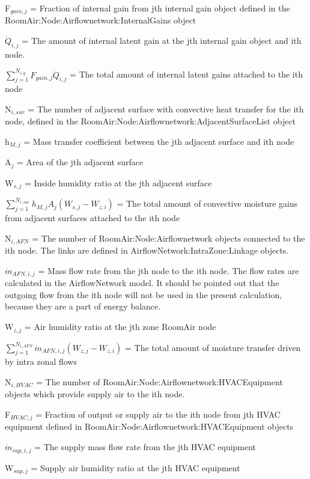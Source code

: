 {F\(_{gain,j}\) = Fraction of internal gain from jth internal gain object defined in the RoomAir:Node:Airflownetwork:InternalGains object

\({\dot Q}_{i,j}\) = The amount of internal latent gain at the jth internal gain object and ith node.

\({\sum\limits_{j = 1}^{N_{i,g}} F_{gain,j}{\dot Q}_{i,j}}\) = The total amount of internal latent gains attached to the ith node

N\(_{i,sur}\) = The number of adjacent surface with convective heat transfer for the ith node, defined in the RoomAir:Node:Airflownetwork:AdjacentSurfaceList object

h\(_{M,j}\) = Mass transfer coefficient between the jth adjacent surface and ith node

A\(_{j}\) = Area of the jth adjacent surface

W\(_{s,j}\) = Inside humidity ratio at the jth adjacent surface

\({\sum\limits_{j = 1}^{N_{i,sur}} h_{M,j} A_j \left( W_{s,j} - W_{z,i}\right)}\) = The total amount of convective moisture gains from adjacent surfaces attached to the ith node

N\(_{i,AFN}\) = The number of RoomAir:Node:Airflownetwork objects connected to the ith node. The links are defined in AirflowNetwork:IntraZone:Linkage objects.

\({\dot m}_{AFN,i,j}\) = Mass flow rate from the jth node to the ith node. The flow rates are calculated in the AirflowNetwork model. It should be pointed out that the outgoing flow from the ith node will not be used in the present calculation, because they are a part of energy balance.

W\(_{z,j}\) = Air humidity ratio at the jth zone RoomAir node

\({\sum\limits_{j = 1}^{N_{i,AFN}} \dot m_{AFN,i,j} \left( W_{z,j} - W_{z,i}\right)}\) = The total amount of moisture transfer driven by intra zonal flows

N\(_{i,HVAC}\) = The number of RoomAir:Node:Airflownetwork:HVACEquipment objects which provide supply air to the ith node.

F\(_{HVAC,j}\) = Fraction of output or supply air to the ith node from jth HVAC equipment defined in RoomAir:Node:Airflownetwork:HVACEquipment objects

\({\dot m}_{sup,i,j}\) = The supply mass flow rate from the jth HVAC equipment

W\(_{sup,j}\) = Supply air humidity ratio at the jth HVAC equipment

}
